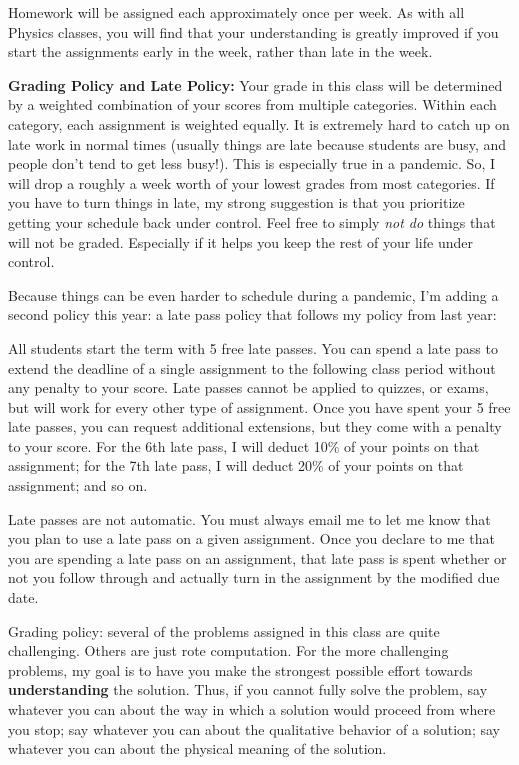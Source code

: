 \documentclass[12pt]{article}
\begin{document}
Homework will be assigned each approximately once per week. As with
all Physics classes, you will find that your understanding is greatly
improved if you start the assignments early in the week, rather than
late in the week.

\noindent\textbf{Grading Policy and Late Policy:}
  Your grade in this class will be determined by a weighted
        combination of your scores from multiple categories. Within
        each category, each assignment is weighted equally. It is
        extremely hard to catch up on late work in normal times
        (usually things are late because students are busy, and people
        don't tend to get less busy!). This is especially true in a
        pandemic. So, I will drop a roughly a week worth of your
        lowest grades from most categories. If you have to turn things
        in late, my strong suggestion is that you prioritize getting
        your schedule back under control. Feel free to simply
        \textit{not do} things that will not be graded. Especially if
        it helps you keep the rest of your life under control.

        Because things can be even harder to schedule during a
        pandemic, I'm adding a second policy this year: a late pass
        policy that follows my policy from last year:

        All students start the term with 5 free late
        passes. You can spend a late pass to extend the deadline of a
        single assignment to the following class period without any
        penalty to your score. Late passes cannot be applied to
        quizzes, or exams, but will work for
        every other type of assignment. Once you have spent your 5
        free late passes, you can request additional extensions, but
        they come with a penalty to your score. For the 6th late pass,
        I will deduct 10\% of your points on that assignment; for the
        7th late pass, I will deduct 20\% of your points on that
        assignment; and so on.
        
        Late passes are not automatic. You must always email me to let me know
        that you plan to use a late pass on a given assignment. Once
        you declare to me that you are spending a  late pass on an
        assignment, that late pass is spent whether or not you follow
        through and actually turn in the assignment by the modified
        due date.

Grading policy: several of the problems assigned in this class are
quite challenging. Others are just rote computation. For the more
challenging problems, my goal is to have you make the strongest
possible effort towards \textbf{understanding} the solution. Thus, if
you cannot fully solve the problem, say whatever you can about the way
in which a solution would proceed from where you stop; say whatever
you can about the qualitative behavior of a solution; say whatever you
can about the physical meaning of the solution. 
\end{document}
